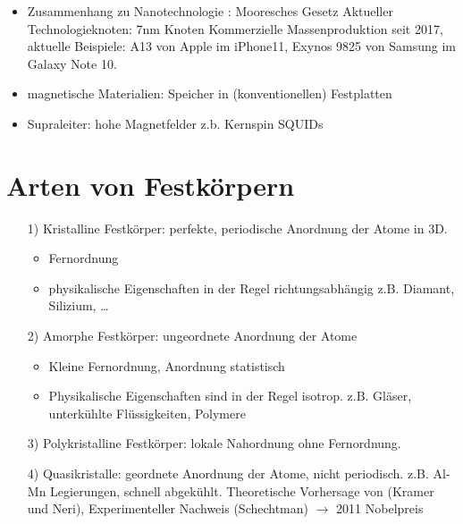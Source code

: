 \begin{itemize}
\begin{itemize}
	        \item Zusammenhang zu Nanotechnologie : Mooresches Gesetz \newline
	        Aktueller Technologieknoten: 7nm Knoten \newline
	        Kommerzielle Massenproduktion seit 2017, aktuelle Beispiele:  A13 von Apple im iPhone11, Exynos 9825 von Samsung im Galaxy Note 10.
	        \item magnetische Materialien: Speicher in (konventionellen) Festplatten
	        \item Supraleiter: hohe Magnetfelder z.b. Kernspin SQUIDs 
	    \end{itemize}
	\end{itemize}

\section*{Arten von Festkörpern}
\begin{itemize}
    \item[1)] Kristalline Festkörper: perfekte, periodische Anordnung der Atome in 3D.
	    \begin{itemize}
	        \item Fernordnung
	        \item physikalische Eigenschaften in der Regel richtungsabhängig
	        z.B. Diamant, Silizium, \dots
	    \end{itemize} 
    \item[2)] Amorphe Festkörper: ungeordnete Anordnung der Atome
	    \begin{itemize}
	        \item Kleine Fernordnung, Anordnung statistisch
	        \item Physikalische Eigenschaften sind in der Regel isotrop. z.B. Gläser, unterkühlte Flüssigkeiten, Polymere
	    \end{itemize}
    \item[3)] Polykristalline Festkörper: lokale Nahordnung ohne Fernordnung.
    \item[4)] Quasikristalle: geordnete Anordnung der Atome, nicht periodisch. z.B. Al-Mn Legierungen, schnell abgekühlt.  Theoretische Vorhersage von (Kramer und Neri), Experimenteller Nachweis (Schechtman) $\rightarrow$ 2011 Nobelpreis
\end{itemize}









